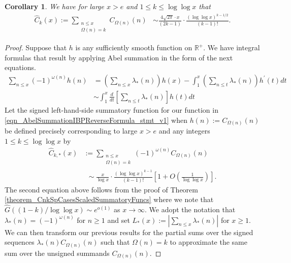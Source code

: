 \documentclass[11pt,reqno,a4letter]{article}
\numberwithin{figure}{section}
\numberwithin{table}{section}
\theoremstyle{plain}
\newtheorem{cor}[theorem]{Corollary}
\numberwithin{theorem}{section}
\theoremstyle{definition}
\begin{document}
\begin{cor} 
\label{cor_SummatoryFuncsOfUnsignedSeqs_v2} 
We have for large $x > e$ and $1 \leq k \leq \log\log x$ that  
\begin{align*} 
\widehat{C}_k(x) := 
     \sum_{\substack{n \leq x \\ \Omega(n) = k}} C_{\Omega(n)}(n) & \sim 
     \frac{4\sqrt{2\pi} \cdot x}{(2k-1)} \cdot \frac{(\log\log x)^{k-1/2}}{(k-1)!}. 
\end{align*} 
\end{cor} 
\begin{proof} 
Suppose that $h$ is any sufficiently smooth function on $\mathbb{R}^{+}$. 
We have integral formulas that result by 
applying Abel summation in the form of the next equations. 
\begin{subequations}
\begin{align} 
\label{eqn_AbelSummationIBPReverseFormula_stmt_v1} 
\sum_{n \leq x} (-1)^{\omega(n)} h(n) & = \left(\sum_{n \leq x} \lambda_{\ast}(n)\right) h(x) - 
     \int_{1}^{x} \left(\sum_{n \leq t} \lambda_{\ast}(n)\right) h^{\prime}(t) dt \\ 
\label{eqn_AbelSummationIBPReverseFormula_stmt_v2}
     & \sim 
     \int_1^{x} \frac{d}{dt}\left[\sum_{n \leq t} \lambda_{\ast}(n)\right] h(t) dt
\end{align} 
\end{subequations}
Let the signed left-hand-side summatory function for our function 
in \eqref{eqn_AbelSummationIBPReverseFormula_stmt_v1} when $h(n) := C_{\Omega(n)}(n)$ be defined precisely 
corresponding to large $x > e$ and any integers $1 \leq k \leq \log\log x$ by 
\begin{align*} 
\widehat{C}_{k,\ast}(x) & := \sum_{\substack{n \leq x \\ \Omega(n)=k}} 
     (-1)^{\omega(n)} C_{\Omega(n)}(n) \\ 
     & \phantom{:} \sim 
     \frac{x}{\log x} \cdot \frac{(\log\log x)^{k-1}}{(k-1)!} \left[ 
     1 + O\left(\frac{1}{\log\log x}\right)\right].
\end{align*} 
The second equation above follows from the proof of 
Theorem \ref{theorem_CnkSpCasesScaledSummatoryFuncs} where 
we note that $\widehat{G}((1-k)/\log\log x) \sim e^{o(1)}$ as 
$x \rightarrow \infty$. 
We adopt the notation that $\lambda_{\ast}(n) = (-1)^{\omega(n)}$ for $n \geq 1$ and 
set $L_{\ast}(x) := \left\lvert \sum_{n \leq x} \lambda_{\ast}(n) \right\rvert$ for $x \geq 1$. 
We can then transform our previous results for the partial sums over the signed sequences 
$\lambda_{\ast}(n) C_{\Omega(n)}(n)$ such that $\Omega(n) = k$ to approximate 
the same sum over the unsigned summands $C_{\Omega(n)}(n)$. 


\end{proof}
\end{document}
